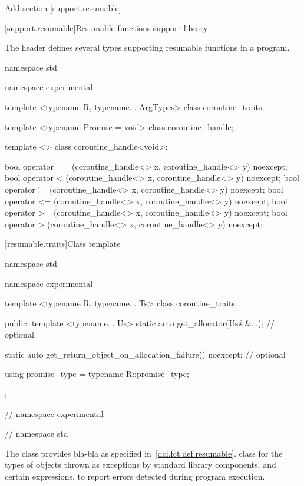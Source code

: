 Add section \ref{support.resumable}

\setcounter{section}{10}
[support.resumable]{Resumable functions support library}

\pnum
The header
\tcode{<experimental/resumable]>}
defines several types supporting resumable functions in a \Cpp program.


%
%
\begin{codeblock}
namespace std {
namespace experimental {
  template <typename R, typename... ArgTypes>
    class coroutine_traits;
	
  template <typename Promise = void>
    class coroutine_handle;		

  template <> class coroutine_handle<void>;
	
  bool operator == (coroutine_handle<> x, coroutine_handle<> y) noexcept;
  bool operator < (coroutine_handle<> x, coroutine_handle<> y) noexcept;			
  bool operator != (coroutine_handle<> x, coroutine_handle<> y) noexcept;
  bool operator <= (coroutine_handle<> x, coroutine_handle<> y) noexcept;			
  bool operator >= (coroutine_handle<> x, coroutine_handle<> y) noexcept;
  bool operator > (coroutine_handle<> x, coroutine_handle<> y) noexcept;			
}
}
\end{codeblock}

[resumable.traits]{Class template }

%
\begin{codeblock}
namespace std {
namespace experimental {
  template <typename R, typename... Ts>
  class coroutine_traits {
  public:
    template <typename... Us>
      static auto get_allocator(Us&&...); // optional
			
    static auto get_return_object_on_allocation_failure() noexcept; // optional
			
    using promise_type = typename R::promise_type;
  };
} // namespace experimental
} // namespace std
\end{codeblock}

\pnum
The class
provides bla-bla as specified in~\ref{dcl.fct.def.resumable}.
class for the types of objects thrown as exceptions by
\Cpp standard library components, and certain
expressions, to report errors detected during program execution.


